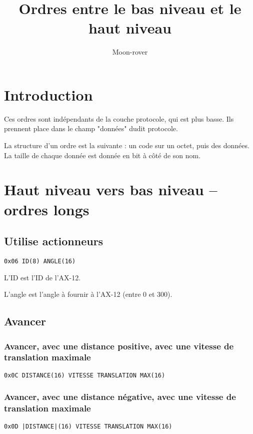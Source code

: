 \documentclass[a4paper, 12pt]{article}
\title{Ordres entre le bas niveau et le haut niveau}
\author{Moon-rover}
\date{}
\begin{document}
\maketitle

\pagestyle{plain}

\tableofcontents


\section{Introduction}

Ces ordres sont indépendants de la couche protocole, qui est plus basse.
Ils prennent place dans le champ "données" dudit protocole.

La structure d'un ordre est la suivante : un code sur un octet, puis des données. La taille de chaque donnée est donnée en bit à côté de son nom.

\section{Haut niveau vers bas niveau -- ordres longs}

\subsection{Utilise actionneurs}
\texttt{0x06 ID(8) ANGLE(16)}

L'ID est l'ID de l'AX-12.

L'angle est l'angle à fournir à l'AX-12 (entre 0 et 300).


\subsection{Avancer}

\subsubsection{Avancer, avec une distance positive, avec une vitesse de translation maximale}
    \texttt{0x0C DISTANCE(16) VITESSE  TRANSLATION  MAX(16)}

\subsubsection{Avancer, avec une distance négative, avec une vitesse de translation maximale}

    \texttt{0x0D |DISTANCE|(16) VITESSE  TRANSLATION  MAX(16)}
    
\end{document}
